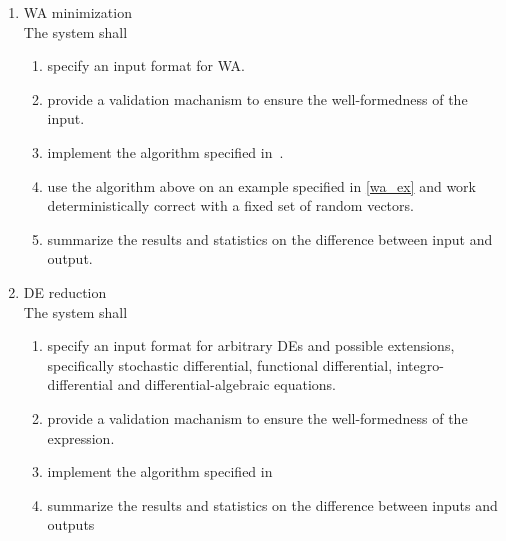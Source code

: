 \begin{enumerate}[F 1.]
                \item WA minimization \\
                    The system shall
                    \begin{enumerate}[1.]
                        \item specify an input format for WA.
                        \item provide a validation machanism to ensure the well-formedness of the input.
                        \item implement the algorithm specified in~\autocite{Kiefer2013OnTC}.
                        \item use the algorithm above on an example specified in \ref{wa_ex} and work deterministically correct with a fixed set of random vectors.
                        \item summarize the results and statistics on the difference between input and output.
                    \end{enumerate}

                \item DE reduction \\
                    The system shall
                    \begin{enumerate}[1.]
                        \item specify an input format for arbitrary DEs and possible extensions, specifically stochastic differential, functional differential, integro-differential and differential-algebraic equations.
                        \item provide a validation machanism to ensure the well-formedness of the expression. 
                        \item implement the algorithm specified in~\autocite{Cardelli2017MaximalAO}
                        \item summarize the results and statistics on the difference between inputs and outputs
                    \end{enumerate}
            

\end{enumerate}
